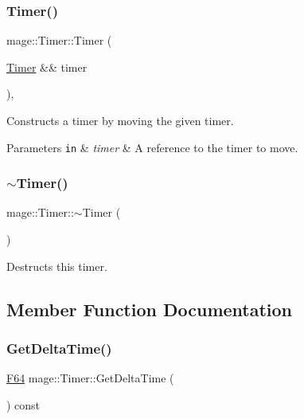 \subsubsection{\texorpdfstring{Timer()}{Timer()}\hspace{0.1cm}{\footnotesize\ttfamily [3/3]}}
{\footnotesize\ttfamily mage\+::\+Timer\+::\+Timer (\begin{DoxyParamCaption}\item[{\hyperlink{classmage_1_1_timer}{Timer} \&\&}]{timer }\end{DoxyParamCaption})\hspace{0.3cm}{\ttfamily [default]}, {\ttfamily [noexcept]}}

Constructs a timer by moving the given timer.


\begin{DoxyParams}[1]{Parameters}
\mbox{\tt in}  & {\em timer} & A reference to the timer to move. \\
\hline
\end{DoxyParams}
\hypertarget{classmage_1_1_timer_a66d6964a6d42eef72f7312f1233e4f74}{}\label{classmage_1_1_timer_a66d6964a6d42eef72f7312f1233e4f74} 
\subsubsection{\texorpdfstring{$\sim$\+Timer()}{~Timer()}}
{\footnotesize\ttfamily mage\+::\+Timer\+::$\sim$\+Timer (\begin{DoxyParamCaption}{ }\end{DoxyParamCaption})\hspace{0.3cm}{\ttfamily [default]}}

Destructs this timer. 

\subsection{Member Function Documentation}
\hypertarget{classmage_1_1_timer_a49d36d6d60530a55af210abd01577365}{}\label{classmage_1_1_timer_a49d36d6d60530a55af210abd01577365} 
\subsubsection{\texorpdfstring{Get\+Delta\+Time()}{GetDeltaTime()}}
{\footnotesize\ttfamily \hyperlink{namespacemage_ad26233bbec640deda836e572c1a23708}{F64} mage\+::\+Timer\+::\+Get\+Delta\+Time (\begin{DoxyParamCaption}{ }\end{DoxyParamCaption}) const\hspace{0.3cm}{\ttfamily [noexcept]}}

